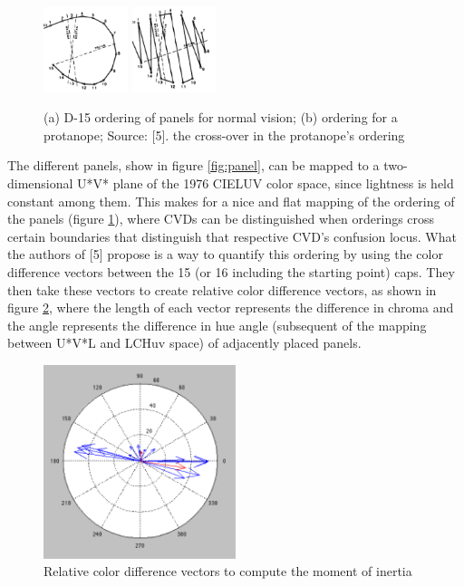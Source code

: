 \documentclass[10pt,twocolumn,letterpaper]{article}
\begin{document}
\begin{figure}[h]
  \includegraphics[width=0.22\textwidth]{luv1.png}
  \includegraphics[width=0.22\textwidth]{luv2.png}
  \caption{(a) D-15 ordering of panels for normal vision; (b) ordering for a protanope; Source: [5]. the cross-over in the protanope's ordering}
  \label{fig:luv}
\end{figure}

The different panels, show in figure \ref{fig:panel}, can be mapped to a two-dimensional U*V* plane of the 1976 CIELUV color space, since lightness is held constant among them. This makes for a nice and flat mapping of the ordering of the panels (figure \ref{fig:luv}), where CVDs can be distinguished when orderings cross certain boundaries that distinguish that respective CVD’s confusion locus. What the authors of [5] propose is a way to quantify this ordering by using the color difference vectors between the 15 (or 16 including the starting point) caps.  They then take these vectors to create relative color difference vectors, as shown in figure \ref{fig:compass}, where the length of each vector represents the difference in chroma and the angle represents the difference in hue angle (subsequent of the mapping between U*V*L and LCHuv space) of adjacently placed panels.  

\begin{figure}[h]
  \includegraphics[width=0.5\textwidth]{compass.png}
  \caption{Relative color difference vectors to compute the moment of inertia}
  \label{fig:compass}
\end{figure}
\end{document}
